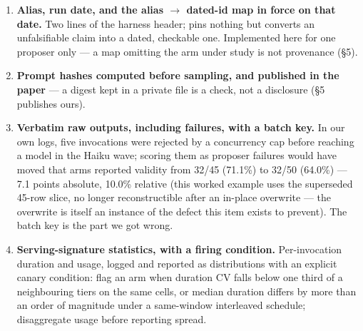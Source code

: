 \begin{enumerate}
\def\labelenumi{\arabic{enumi}.}
\item
  \textbf{Alias, run date, and the alias \(\rightarrow\) dated-id map in force on that date.} Two lines of the harness header; pins nothing but converts an unfalsifiable claim into a dated, checkable one. Implemented here for one proposer only --- a map omitting the arm under study is not provenance (§5).
\item
  \textbf{Prompt hashes computed before sampling, and published in the paper} --- a digest kept in a private file is a check, not a disclosure (§5 publishes ours).
\item
  \textbf{Verbatim raw outputs, including failures, with a batch key.} In our own logs, five invocations were rejected by a concurrency cap before reaching a model in the Haiku wave; scoring them as proposer failures would have moved that arm\textquotesingle s reported validity from 32/45 (71.1\%) to 32/50 (64.0\%) --- 7.1 points absolute, 10.0\% relative (this worked example uses the superseded 45-row slice, no longer reconstructible after an in-place overwrite --- the overwrite is itself an instance of the defect this item exists to prevent). The batch key is the part we got wrong.
\item
  \textbf{Serving-signature statistics, with a firing condition.} Per-invocation duration and usage, logged and reported as distributions with an explicit canary condition: flag an arm when duration CV falls below one third of a neighbouring tier\textquotesingle s on the same cells, or median duration differs by more than an order of magnitude under a same-window interleaved schedule; disaggregate usage before reporting spread.


\end{enumerate}

